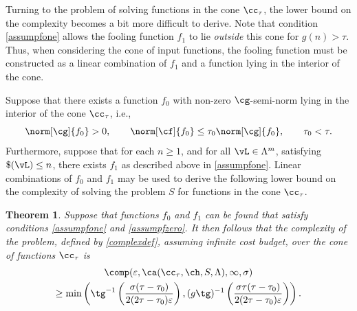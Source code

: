 \documentclass[]{elsarticle}
\newtheorem{theorem}{Theorem}
\theoremstyle{definition}
\theoremstyle{remark}
\begin{document}
Turning to the problem of solving functions in the cone $\cc_{\tau}$, the lower bound on the complexity becomes a bit more difficult to derive.  Note that condition \eqref{assumpfone} allows the fooling function $f_1$ to lie \emph{outside} this cone for $g(n) > \tau$.  Thus, when considering the cone of input functions, the fooling function must be constructed as a linear combination of $f_1$ and a function lying in the interior of the cone.

Suppose that there exists a function $f_0$ with non-zero $\cg$-semi-norm lying in the interior of the cone $\cc_{\tau}$, i.e.,
\begin{equation}
\label{assumpfzero}
\norm[\cg]{f_{0}} > 0, \qquad \norm[\cf]{f_{0}} \le \tau_0 \norm[\cg]{f_{0}}, \qquad \tau_0 < \tau.
\end{equation}
Furthermore, suppose that for each $n \ge 1$, and for all $\vL \in \Lambda^m$, satisfying $\$(\vL)\le n$, there exists $f_1$ as described above in \eqref{assumpfone}. Linear combinations of $f_0$ and $f_1$ may be used to derive the following lower bound on the complexity of solving the problem $S$ for functions in the cone $\cc_{\tau}$.

\begin{theorem} \label{complowbd} Suppose that functions $f_{0}$ and $f_1$ can be found that satisfy conditions \eqref{assumpfone} and \eqref{assumpfzero}.  It then follows that the complexity of the problem, defined by \eqref{complexdef}, assuming infinite cost budget, over the cone of functions $\cc_{\tau}$ is
\begin{multline*}
\comp(\varepsilon,\ca(\cc_{\tau},\ch,S,\Lambda),\infty,\sigma) \\
\ge \min\left(\tg^{-1}\left(\frac{\sigma(\tau-\tau_0)}{2(2\tau-\tau_0)\varepsilon}\right), (g\tg)^{-1}\left(\frac{\sigma\tau(\tau-\tau_0)}{2(2\tau-\tau_0)\varepsilon}\right) \right).
\end{multline*}
\end{theorem}
\end{document}
